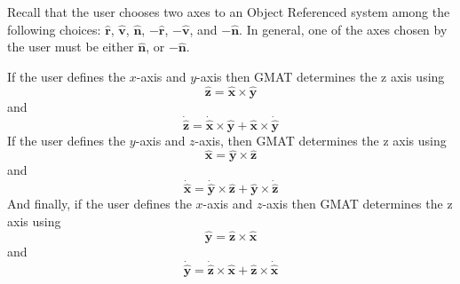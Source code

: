 {Recall that the user chooses two axes to  an Object Referenced
system among the following choices:   $\hat{\mathbf{r}}$,
$\hat{\mathbf{v}}$, $\hat{\mathbf{n}}$,  $-\hat{\mathbf{r}}$,
$-\hat{\mathbf{v}}$, and $-\hat{\mathbf{n}}$.  In general, one of
the axes chosen by the user must be either $\hat{\mathbf{n}}$, or
$-\hat{\mathbf{n}}$.


If the user defines the $x$-axis and $y$-axis then GMAT determines
the z axis using
%
\begin{equation}
    \hat{\mathbf{z}} =  \hat{\mathbf{x}}\times\hat{\mathbf{y}}
\end{equation}
%
and
%
\begin{equation}
    \dot{\hat{\mathbf{z}}} =  \dot{\hat{\mathbf{x}}}
    \times\hat{\mathbf{y}}+  \hat{\mathbf{x}} \times
    \dot{\hat{\mathbf{y}}}
\end{equation}
%
If the user defines the $y$-axis and $z$-axis, then GMAT
determines the z axis using
%
\begin{equation}
    \hat{\mathbf{x}} =  \hat{\mathbf{y}}\times\hat{\mathbf{z}}
\end{equation}
%
and
%
\begin{equation}
    \dot{\hat{\mathbf{x}}} =  \dot{\hat{\mathbf{y}}}
    \times\hat{\mathbf{z}}+  \hat{\mathbf{y}} \times
    \dot{\hat{\mathbf{z}}}
\end{equation}
%
And finally, if the user defines the $x$-axis and $z$-axis then
GMAT determines the z axis using
%
\begin{equation}
    \hat{\mathbf{y}} =  \hat{\mathbf{z}}\times\hat{\mathbf{x}}
\end{equation}
%
and
%
\begin{equation}
    \dot{\hat{\mathbf{y}}} =  \dot{\hat{\mathbf{z}}}
    \times\hat{\mathbf{x}}+  \hat{\mathbf{z}} \times
    \dot{\hat{\mathbf{x}}}
\end{equation}
%


}
